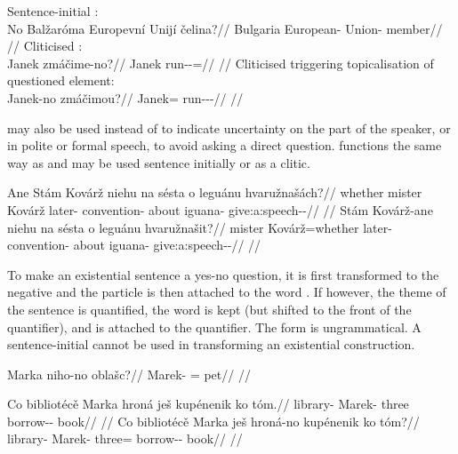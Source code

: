 \pex
\a Sentence-initial :\\
  \begingl
  \gla No Balžaróma Europevní Unijí čelina?//
  \glb \Q{} Bulgaria European-\Att{} Union-\Gen{} member//
  \glft {}//
  \endgl
\a Cliticised :\\
  \begingl
  \gla Janek zmáčime-no?//
  \glb Janek run-\Av{}-\Prog{}=\Q{}//
  \glft {}//
  \endgl
\a Cliticised  triggering topicalisation of questioned element:\\
  \begingl
  \gla Janek-no zmáčimou?//
  \glb Janek=\Q{} run-\Av{}-\Prog{}-\Nz{}//
  \glft {}//
  \endgl
\xe

 may also be used instead of  to indicate uncertainty on the part of the speaker, or in polite or formal speech, to avoid asking a direct question.  functions the same way as  and may be used sentence initially or as a clitic.

\pex
\a\begingl
  \gla Ane Stám Kovárž niehu na sésta o leguánu hvaružnašách?//
  \glb whether mister Kovárž later-\Ins{} \Loc{} convention-\Acc{} about iguana-\Ins{} give:a:speech-\Av{}-\Ctp{}//
  \glft {}//
  \endgl
\a\begingl
  \gla Stám Kovárž-ane niehu na sésta o leguánu hvaružnašit?//
  \glb mister Kovárž=whether later-\Ins{} \Loc{} convention-\Acc{} about iguana-\Ins{} give:a:speech-\Av{}-\Sup{}//
  \glft {}//
  \endgl
\xe

To make an existential sentence a yes-no question, it is first transformed to the negative and the particle  is then attached to the word . If however, the theme of the sentence is quantified, the word  is kept (but shifted to the front of the quantifier), and  is attached to the quantifier. The form  is ungrammatical. A sentence-initial  cannot be used in transforming an existential construction.

\pex
\begingl
\gla Marka niho-no oblašc?//
\glb Marek-\Acc{} \N{}\Exst{}=\Q{} pet//
\glft {}//
\endgl
\xe

\pex
\a
\begingl
\gla Co bibliotécě Marka hroná ješ kupénenik ko tóm.//
\glb \Abl{} library-\Gen{} Marek-\Acc{} three \Exst{} borrow-\Pv{}-\Pf{} \Lnk{} book//
\glft {}//
\endgl
\a
\begingl
\gla Co bibliotécě Marka ješ hroná-no kupénenik ko tóm?//
\glb \Abl{} library-\Gen{} Marek-\Acc{} \Exst{} three=\Q{} borrow-\Pv{}-\Pf{} \Lnk{} book//
\glft {}//
\endgl
\xe

